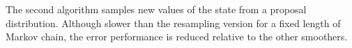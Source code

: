 \documentclass[journal]{IEEEtran}
\begin{document}
The second algorithm samples new values of the state from a proposal distribution. Although slower than the resampling version for a fixed length of Markov chain, the error performance is reduced relative to the other smoothers.





%
%



%
%
\end{document}
